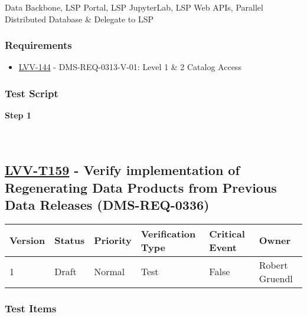 Data Backbone, LSP Portal, LSP JupyterLab, LSP Web APIs, Parallel
Distributed Database \& Delegate to LSP

\hypertarget{requirements-58}{%
\subsubsection{Requirements}\label{requirements-58}}

\begin{itemize}
\tightlist
\item
  \href{https://jira.lsstcorp.org/browse/LVV-144}{LVV-144} -
  DMS-REQ-0313-V-01: Level 1 \& 2 Catalog Access
\end{itemize}

\hypertarget{test-script-58}{%
\subsubsection{Test Script}\label{test-script-58}}

\textbf{Step 1}\\
~\\
~\\

\hypertarget{lvv-t159---verify-implementation-of-regenerating-data-products-from-previous-data-releases-dms-req-0336}{%
\subsection{\texorpdfstring{\href{https://jira.lsstcorp.org/secure/Tests.jspa\#/testCase/LVV-T159}{LVV-T159}
- Verify implementation of Regenerating Data Products from Previous Data
Releases
(DMS-REQ-0336)}{LVV-T159 - Verify implementation of Regenerating Data Products from Previous Data Releases (DMS-REQ-0336)}}\label{lvv-t159---verify-implementation-of-regenerating-data-products-from-previous-data-releases-dms-req-0336}}

\begin{longtable}[]{@{}llllll@{}}
\toprule
Version & Status & Priority & Verification Type & Critical Event &
Owner\tabularnewline
\midrule
\endhead
1 & Draft & Normal & Test & False & Robert Gruendl\tabularnewline
\bottomrule
\end{longtable}

\hypertarget{test-items-59}{%
\subsubsection{Test Items}\label{test-items-59}}

